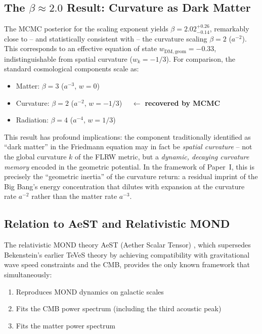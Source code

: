 \documentclass[aps,prd,twocolumn,superscriptaddress,nofootinbib]{revtex4-2}
\begin{document}
\subsection{The $\beta \approx 2.0$ Result: Curvature as Dark Matter}

The MCMC posterior for the scaling exponent yields $\beta = 2.02^{+0.26}_{-0.14}$, remarkably close to -- and statistically consistent with -- the curvature scaling $\beta = 2$ ($a^{-2}$). This corresponds to an effective equation of state $w_{\mathrm{DM,geom}} = -0.33$, indistinguishable from spatial curvature ($w_k = -1/3$). For comparison, the standard cosmological components scale as:
\begin{itemize}
\item Matter: $\beta = 3$ ($a^{-3}$, $w = 0$)
\item Curvature: $\beta = 2$ ($a^{-2}$, $w = -1/3$) $\quad\leftarrow$ \textbf{recovered by MCMC}
\item Radiation: $\beta = 4$ ($a^{-4}$, $w = 1/3$)
\end{itemize}

This result has profound implications: the component traditionally identified as ``dark matter'' in the Friedmann equation may in fact be \textit{spatial curvature} -- not the global curvature $k$ of the FLRW metric, but a \textit{dynamic, decaying curvature memory} encoded in the geometric potential. In the framework of Paper~I, this is precisely the ``geometric inertia'' of the curvature return: a residual imprint of the Big Bang's energy concentration that dilutes with expansion at the curvature rate $a^{-2}$ rather than the matter rate $a^{-3}$.

\subsection{Relation to AeST and Relativistic MOND}

The relativistic MOND theory AeST (Aether Scalar Tensor) \cite{Skordis2021}, which supersedes Bekenstein's earlier TeVeS theory \cite{Bekenstein2004} by achieving compatibility with gravitational wave speed constraints and the CMB, provides the only known framework that simultaneously:
\begin{enumerate}
\item Reproduces MOND dynamics on galactic scales
\item Fits the CMB power spectrum (including the third acoustic peak)
\item Fits the matter power spectrum
\end{enumerate}
\end{document}
